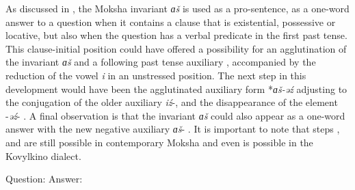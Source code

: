 \documentclass[output=paper]{langsci/langscibook}
\begin{document}
As discussed in , the Moksha invariant \textit{ɑš} is
used as a pro-sentence, as a one-word answer to a question when it contains
a clause that is existential, possessive or locative, but also when the
question has a verbal predicate in the first past tense. This
clause-initial position  could have offered a
possibility for an agglutination of the invariant \textit{ɑš} and a
following past tense auxiliary , accompanied by the
reduction of the vowel \textit{i} in an unstressed position. The next step
in this development would have been the agglutinated auxiliary form
\mbox{*\textit{ɑš-əź}} adjusting to the conjugation of the older auxiliary \textit{iź}-, and the disappearance of the element -\textit{əź}- . A final observation is that the invariant \textit{ɑš} could also appear as a one-word answer with the new negative auxiliary \textit{ɑš}- . It is important to note that steps ,  and  are still possible in contemporary Moksha and even  is possible in the Kovylkino dialect.
\begin{exe}
\ex\label{ex:moksha-sing}
Question:
Answer:
\end{exe}
\end{document}
